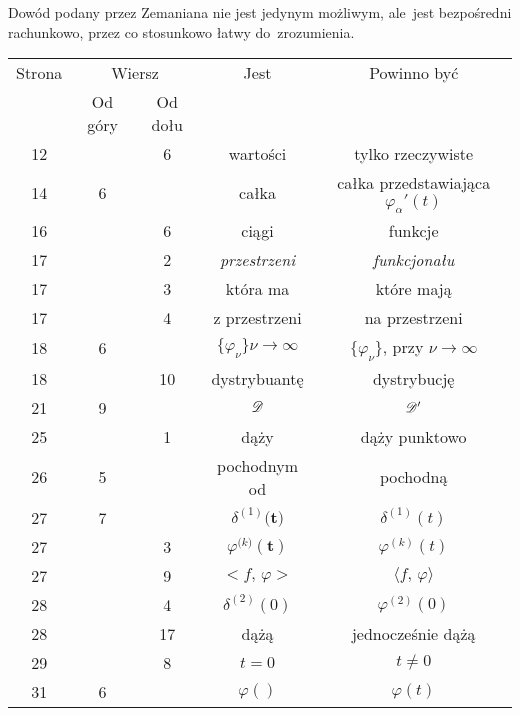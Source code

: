 \documentclass[a4paper,11pt]{article}
\begin{document}
Dowód podany przez Zemaniana nie jest jedynym możliwym, ale~jest
bezpośredni rachunkowo, przez co stosunkowo łatwy do~zrozumienia.





\newpage



\begin{center}

  \begin{tabular}{|c|c|c|c|c|}
    \hline
    Strona & \multicolumn{2}{c|}{Wiersz} & Jest
                              & Powinno być \\ \cline{2-3}
    & Od góry & Od dołu & & \\
    \hline
    12  & &  6 & wartości & tylko rzeczywiste \\
    14  &  6 & & całka & całka przedstawiająca $\varphi_{ \alpha }'( t )$ \\
    16  & &  6 & ciągi & funkcje \\
    17  & &  2 & \textit{przestrzeni} & \textit{funkcjonału} \\
    17  & &  3 & która ma & które mają \\
    17  & &  4 & z przestrzeni & na przestrzeni \\
    18  &  6 & & $\{ \varphi_{ \nu } \}\nu \to \infty$
           & $\{ \varphi_{ \nu } \}$, przy $\nu \to \infty$ \\
    18  & & 10 & dystrybuantę & dystrybucję \\
    21  &  9 & & $\mathcal{D}$ & $\mathcal{D}'$ \\
    25  & &  1 & dąży & dąży punktowo \\
    26  &  5 & & pochodnym od & pochodną \\
    27  &  7 & & $\delta^{ ( 1 ) }\boldsymbol{ ( t } )$ & $\delta^{ ( 1 ) }( t )$ \\
    27  & &  3 & $\varphi^{ ( k \boldsymbol{ ) } }\boldsymbol{ ( t ) } $
           & $\varphi^{ ( k ) }( t )$ \\
    27  & &  9 & $< f,\, \varphi >$ & $\langle f, \, \varphi \rangle$ \\
    28  & &  4 & $\delta^{ ( 2 ) }( 0 )$ & $\varphi^{ ( 2 ) }( 0 )$ \\
    28  & & 17 & dążą & jednocześnie dążą \\
    29  & &  8 & $t = 0$ & $t \neq 0$ \\
    31  &  6 & & $\varphi( )$ & $\varphi( t )$ \\

\end{tabular}
\end{center}
\end{document}
